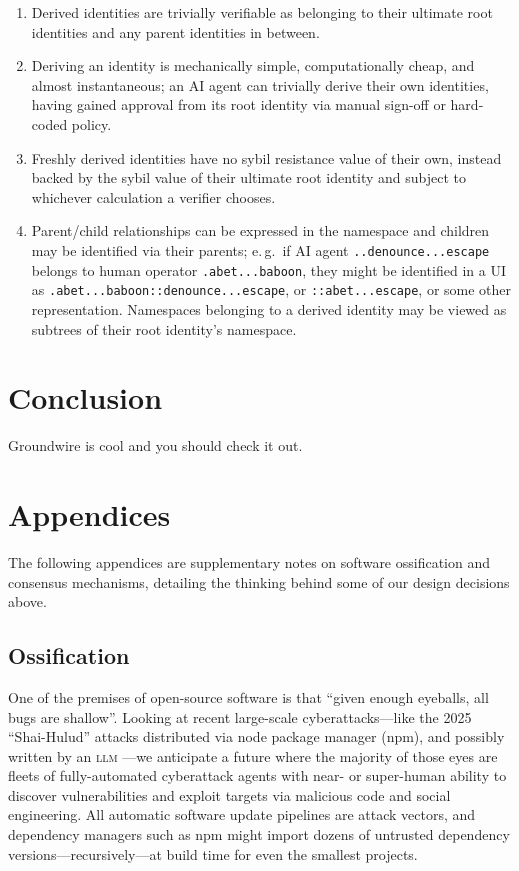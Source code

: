 \documentclass[twoside]{article}
\begin{document}
\begin{enumerate}[noitemsep,topsep=2pt]
\def\labelenumi{\arabic{enumi}.}

\item
  Derived identities are trivially verifiable as belonging to their
  ultimate root identities and any parent identities in between.
\item
  Deriving an identity is mechanically simple, computationally cheap,
  and almost instantaneous; an AI agent can trivially derive their own
  identities, having gained approval from its root identity via manual
  sign-off or hard-coded policy.
\item
  Freshly derived identities have no sybil resistance value of their
  own, instead backed by the sybil value of their ultimate root identity
  and subject to whichever calculation a verifier chooses.
\item
  Parent/child relationships can be expressed in the namespace and
  children may be identified via their parents; e.\,g.\ if AI agent
  \texttt{..denounce...escape} belongs to human operator
  \texttt{.abet...baboon}, they might be identified in a UI as
  \texttt{.abet...baboon::denounce...escape}, or
  \texttt{::abet...escape}, or some other representation. Namespaces
  belonging to a derived identity may be viewed as subtrees of their
  root identity's namespace.
\end{enumerate}

\section{Conclusion}\label{conclusion}

Groundwire is cool and you should check it out.\tombstone

\section{Appendices}\label{appendices}

The following appendices are supplementary notes on software
ossification and consensus mechanisms, detailing the thinking behind
some of our design decisions above.

\subsection{Ossification}\label{ossification}

One of the premises of open-source software is that ``given enough
eyeballs, all bugs are shallow''. Looking at recent large-scale
cyberattacks---like the 2025 ``Shai-Hulud'' attacks distributed via
node package manager (npm), and possibly written by an \textsc{llm} \citep{Moore2025ShaiHulud}---we anticipate
a future where the majority of those eyes are fleets of fully-automated
cyberattack agents with near- or super-human ability to discover
vulnerabilities and exploit targets via malicious code and social
engineering. All automatic software update pipelines are attack vectors,
and dependency managers such as npm might import dozens of untrusted
dependency versions---recursively---at build time for even the
smallest projects.
\end{document}
